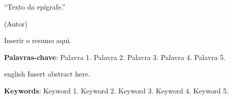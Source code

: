 \documentclass[
    12pt,
    oneside,
    a4paper,
    chapter=TITLE,
    section=TITLE,
    english,
    brazil
]{abntex2}
\begin{document}
\begin{epigrafe}
    \vspace*{\fill}
    \begin{citacao}
        ``Texto da epígrafe.'' \par (Autor)
    \end{citacao}
\end{epigrafe}

\setlength{\absparsep}{18pt}
\begin{resumo}
Inserir o resumo aqui.

\textbf{Palavras-chave}: Palavra 1. Palavra 2. Palavra 3. Palavra 4. Palavra 5.
\end{resumo}

\begin{resumo}[Abstract]
\begin{otherlanguage*}{english}
Insert abstract here.

\textbf{Keywords}: Keyword 1. Keyword 2. Keyword 3. Keyword 4. Keyword 5.
\end{otherlanguage*}
\end{resumo}

\listoffigures*
\cleardoublepage

\listoftables*
\cleardoublepage

\tableofcontents*
\cleardoublepage

\textual









\postextual


\end{document}
